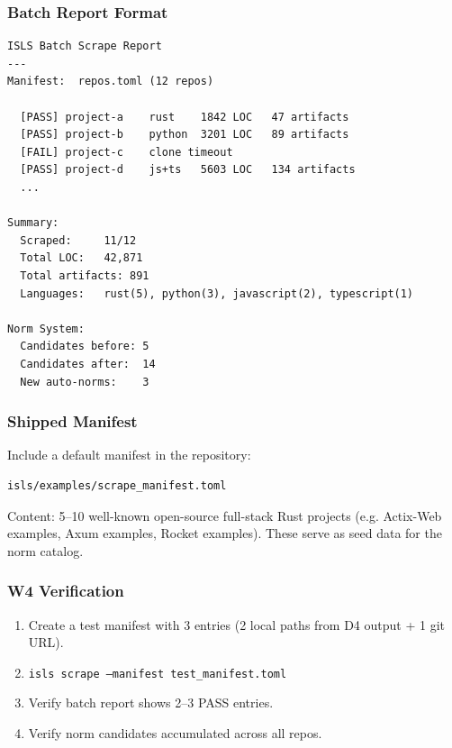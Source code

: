 \documentclass[11pt,a4paper]{article}
\begin{document}
\subsubsection{Batch Report Format}

\begin{lstlisting}[style=bash]
ISLS Batch Scrape Report
---
Manifest:  repos.toml (12 repos)

  [PASS] project-a    rust    1842 LOC   47 artifacts
  [PASS] project-b    python  3201 LOC   89 artifacts
  [FAIL] project-c    clone timeout
  [PASS] project-d    js+ts   5603 LOC   134 artifacts
  ...

Summary:
  Scraped:     11/12
  Total LOC:   42,871
  Total artifacts: 891
  Languages:   rust(5), python(3), javascript(2), typescript(1)

Norm System:
  Candidates before: 5
  Candidates after:  14
  New auto-norms:    3
\end{lstlisting}

\subsubsection{Shipped Manifest}

Include a default manifest in the repository:

\begin{lstlisting}[style=bash]
isls/examples/scrape_manifest.toml
\end{lstlisting}

Content: 5--10 well-known open-source full-stack Rust projects
(e.g. Actix-Web examples, Axum examples, Rocket examples). These
serve as seed data for the norm catalog.

\subsubsection{W4 Verification}

\begin{enumerate}[nosep]
\item Create a test manifest with 3 entries (2 local paths from
      D4 output + 1 git URL).
\item \texttt{isls scrape --manifest test\_manifest.toml}
\item Verify batch report shows 2--3 PASS entries.
\item Verify norm candidates accumulated across all repos.
\end{enumerate}


\end{document}
